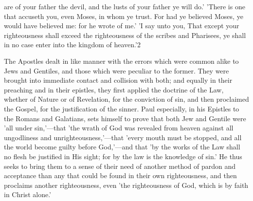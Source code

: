 \documentclass[
]{book}
\begin{document}
are of your father the devil, and the lusts of your father ye will do.' 'There is one that accuseth you, even Moses, in whom ye trust. For had ye believed Moses, ye would have believed me: for he wrote of me.' 'I say unto you, That except your righteousness shall exceed the righteousness of the scribes and Pharisees, ye shall in no case enter into the kingdom of heaven.'2

The Apostles dealt in like manner with the errors which were common alike to Jews and Gentiles, and those which were peculiar to the former. They were brought into immediate contact and collision with both; and equally in their preaching and in their epistles, they first applied the doctrine of the Law, whether of Nature or of Revelation, for the conviction of sin, and then proclaimed the Gospel, for the justification of the sinner. Paul especially, in his Epistles to the Romans and Galatians, sets himself to prove that both Jew and Gentile were 'all under sin,'---that 'the wrath of God was revealed from heaven against all ungodliness and unrighteousness,'---that 'every mouth must be stopped, and all the world become guilty before God,'---and that 'by the works of the Law shall no flesh be justified in His sight; for by the law is the knowledge of sin.' He thus seeks to bring them to a sense of their need of another method of pardon and acceptance than any that could be found in their own righteousness, and then proclaims another righteousness, even 'the righteousness of God, which is by faith in Christ alone.'
\end{document}

